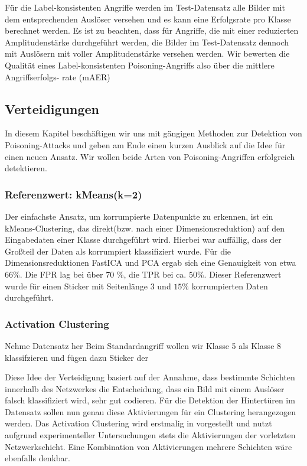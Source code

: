 \documentclass[11pt,a4paper]{article}
\numberwithin{equation}{section}
\begin{document}
	Für die Label-konsistenten Angriffe werden im Test-Datensatz alle Bilder mit
	dem entsprechenden Auslöser versehen und es kann eine Erfolgsrate pro Klasse
	berechnet werden. Es ist zu beachten, dass für Angriffe, die mit einer reduzierten
	Amplitudenstärke durchgeführt werden, die Bilder im Test-Datensatz dennoch mit
	Auslösern mit voller Amplitudenstärke versehen werden. Wir bewerten die Qualität
	eines Label-konsistenten Poisoning-Angriffs also über die mittlere Angriffserfolgs-
	rate (mAER) 
 
	
	\subsection{Verteidigungen}
	In diesem Kapitel beschäftigen wir uns mit gängigen Methoden zur Detektion von Poisoning-Attacks und geben am Ende einen kurzen Ausblick auf die Idee für einen neuen Ansatz.
	Wir wollen beide Arten von Poisoning-Angriffen erfolgreich detektieren. 
	
	\subsubsection{Referenzwert: kMeans(k=2)}
	Der einfachste Ansatz, um korrumpierte Datenpunkte zu erkennen, ist ein kMeans-Clustering, das direkt(bzw. nach einer Dimensionsreduktion) auf den Eingabedaten einer Klasse durchgeführt wird. Hierbei war auffällig, dass der Großteil der Daten als korrumpiert klassifiziert wurde. Für die Dimensionsreduktionen FastICA und PCA ergab sich eine Genauigkeit von etwa $66 \%$. Die FPR lag bei über 70 \%, die TPR bei ca. $50 \%$.
	Dieser Referenzwert wurde für einen Sticker mit Seitenlänge 3 und $15 \%$ korrumpierten Daten durchgeführt.
	\subsubsection{Activation Clustering}
	
	
	Nehme Datensatz her
	Beim Standardangriff wollen wir Klasse 5 als Klasse 8 klassifzieren und fügen dazu Sticker der  
	
	
	Diese Idee der Verteidigung basiert auf der Annahme, dass bestimmte Schichten innerhalb des Netzwerkes die Entscheidung, dass ein Bild mit einem Auslöser falsch klassifiziert wird, sehr gut codieren. Für die Detektion der Hintertüren im Datensatz sollen nun genau diese Aktivierungen für ein Clustering herangezogen werden.
	Das Activation Clustering wird erstmalig in \cite{AC} vorgestellt und nutzt aufgrund experimenteller Untersuchungen stets die Aktivierungen der vorletzten Netzwerkschicht.
	Eine Kombination von Aktivierungen mehrere Schichten wäre ebenfalls denkbar.
	
\end{document}
